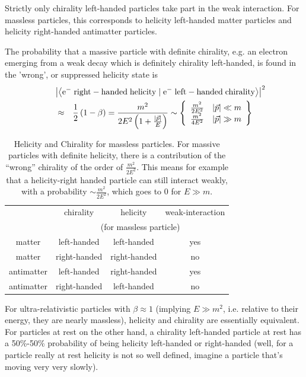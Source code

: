  Strictly only chirality left-handed particles take part in the weak
 interaction. For massless particles, this corresponds to helicity
 left-handed matter particles and helicity right-handed antimatter
 particles.

 The probability that a massive particle with definite chirality, e.g. an electron
 emerging from a weak decay which is definitely chirality
 left-handed, is found in the 'wrong', or suppressed
 helicity state is
\begin{eqnarray}
\label{eq:wrongHeliProb}
\lefteqn{ \left|\braket{\mathrm{e^-\;right-handed\;helicity}}{\mathrm{e^-\;left-handed\;chirality}}\right|^2 } \nonumber\\
 &\approx &
 \half \left(1 - \beta \right)
 =
 \frac{m^2}{ 2E^2 \left( 1 + \frac{|\vec{p}|}{E}\right)}
  \sim \left\{
 \begin{array}{lr}
    \frac{m^2}{2E^2} &   |\vec{p}| \ll m \\
    \frac{m^2}{4 E^2} &  |\vec{p}| \gg m
  \end{array}
  \right\}
\end{eqnarray}
\begin{table}
\caption{Helicity and Chirality for massless particles.  For massive
 particles with definite helicity, there is a
 contribution of the ``wrong'' chirality of the order of $\frac{m^2}{2E^2}$. This means for example that a helicity-right handed particle can still interact weakly, with a probability $\sim \frac{m^2}{2E^2}$, which goes to $0$ for $E\gg m$.
\label{tab:helichi}}
\begin{tabular}{c|cc c}
           &  chirality & helicity        & weak-interaction\\
           & \multicolumn{3}{|c|}{\small(for massless particle)} \\
 matter    &  left-handed & left-handed   &   yes \\
 matter    &  right-handed & right-handed &   no  \\
antimatter &  left-handed  & right-handed &   yes \\
antimatter &  right-handed & left-handed  &   no \\
\end{tabular}
\end{table}
 For ultra-relativistic particles with $\beta \approx 1$ (implying $E\gg m^2$, i.e. relative to
 their energy, they are nearly massless), helicity and chirality are
 essentially equivalent. For particles at rest on the other hand, a
 chirality left-handed particle at rest has a 50\%-50\% probability of
 being helicity left-handed or right-handed (well, for a particle
 really at rest helicity is not so well defined, imagine a particle
 that's moving very very slowly).


